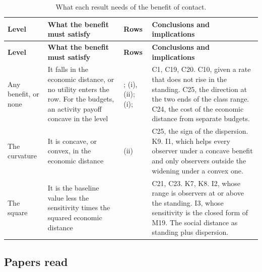 \footnotesize
\begin{longtable}{@{}P{2.3cm}P{4.6cm}P{3.6cm}P{5.5cm}@{}}
\caption{What each result needs of the benefit of contact.}
\label{tab:levels}\\
\toprule
\textbf{Level} & \textbf{What the benefit must satisfy} & \textbf{Rows} &
\textbf{Conclusions and implications} \\
\midrule
\endfirsthead
\toprule
\textbf{Level} & \textbf{What the benefit must satisfy} & \textbf{Rows} &
\textbf{Conclusions and implications} \\
\midrule
\endhead
\bottomrule
\endfoot
Any benefit, or none & It falls in the economic distance, or no utility
  enters the row. For the budgets, an activity payoff concave in the level &
  ;  (i), (ii);  (i);
   & C1, C19, C20. C10, given a rate that does not rise in
  the standing. C25, the direction at the two ends of the class range. C24,
  the cost of the economic distance from separate budgets. \\
  \addlinespace
The curvature & It is concave, or convex, in the economic distance &
   (ii) & C25, the sign of the dispersion. K9. I1, which helps
  every observer under a concave benefit and only observers outside the
  widening under a convex one. \\
  \addlinespace
The square & It is the baseline value less the sensitivity times the
  squared economic distance &  & C21, C23. K7, K8. I2,
  whose range is observers at or above the standing. I3, whose sensitivity
  is the closed form of M19. The social distance as standing plus
  dispersion. \\
\end{longtable}
\normalsize

\subsection{Papers read}

